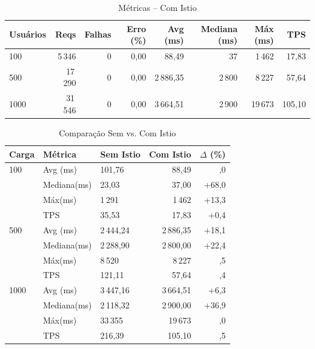 \documentclass[12pt,a4paper]{report}
\begin{document}
\begin{table}[H]
\centering
\caption{Métricas – Com Istio}\label{tab:com-istio}
\begin{tabular}{@{}lrrrrrrr@{}}
\toprule
Usuários & Reqs & Falhas & Erro (\%) & Avg (ms) & Mediana (ms) & Máx (ms) & TPS \\
\midrule
100  & 5\,346  & 0     & 0,00 & 88,49   & 37      & 1\,462  & 17,83  \\
500  & 17\,290 & 0     & 0,00 & 2\,886,35 & 2\,800  & 8\,227  & 57,64  \\
1000 & 31\,546 & 0     & 0,00 & 3\,664,51 & 2\,900  & 19\,673 & 105,10 \\
\bottomrule
\end{tabular}
\end{table}

\begin{table}[H]
\centering
\caption{Comparação Sem vs. Com Istio}\label{tab:comp}
\begin{tabular}{@{}lllrr@{}}
\toprule
Carga & Métrica    & Sem Istio    & Com Istio    & $\Delta$ (\%)    \\
\midrule
100  & Avg (ms)    & 101,76        & 88,49         & \textminus13,0 \\
     & Mediana(ms) & 23,03         & 37,00         & +68,0          \\
     & Máx(ms)     & 1\,291        & 1\,462        & +13,3          \\
     & TPS         & 35,53         & 17,83         & +0,4           \\
\midrule
500  & Avg (ms)    & 2\,444,24     & 2\,886,35     & +18,1          \\
     & Mediana(ms) & 2\,288,90     & 2\,800,00     & +22,4          \\
     & Máx(ms)     & 8\,520        & 8\,227        & \textminus3,5  \\
     & TPS         & 121,11        & 57,64         & \textminus52,4 \\
\midrule
1000 & Avg (ms)    & 3\,447,16     & 3\,664,51     & +6,3           \\
     & Mediana(ms) & 2\,118,32     & 2\,900,00     & +36,9          \\
     & Máx(ms)     & 33\,355       & 19\,673       & \textminus41,0 \\
     & TPS         & 216,39        & 105,10        & \textminus51,5 \\
\bottomrule
\end{tabular}
\end{table}
\end{document}
